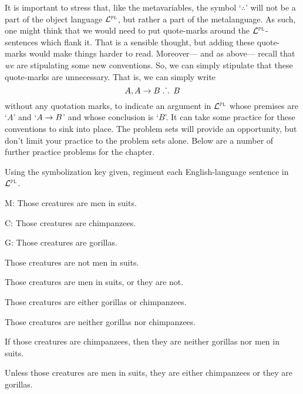 It is important to stress that, like the metavariables, the symbol `$\therefore$' will not be a part of the object language $\mathcal{L}^{\textsc{pl}}$, but rather a part of the metalanguage.
As such, one might think that we would need to put quote-marks around the $\mathcal{L}^{\textsc{pl}}$-sentences which flank it.
That is a sensible thought, but adding these quote-marks would make things harder to read.
Moreover--- and as above--- recall that \emph{we} are stipulating some new conventions.
So, we can simply stipulate that these quote-marks are unnecessary.
That is, we can simply write
$$A, A \rightarrow B \; \ldotp\dot{}\,\ldotp \; B$$
without any quotation marks, to indicate an argument in $\mathcal{L}^{\textsc{pl}}$ whose premises are `$A$' and `$A \rightarrow B$' and whose conclusion is `$B$'.
It can take some practice for these conventions to sink into place.
The problem sets will provide an opportunity, but don't limit your practice to the problem sets alone.
Below are a number of further practice problems for the chapter.









\iffalse

\practiceproblems

\solutions
\problempart Using the symbolization key given, regiment each English-language sentence in $\mathcal{L}^{\textsc{pl}}$.
\label{pr.monkeysuits}
\begin{ekey}
\item[M:] Those creatures are men in suits. 
\item[C:] Those creatures are chimpanzees. 
\item[G:] Those creatures are gorillas.
\end{ekey}
\begin{earg}
\item Those creatures are not men in suits.
\item Those creatures are men in suits, or they are not.
\item Those creatures are either gorillas or chimpanzees.
\item Those creatures are neither gorillas nor chimpanzees.
\item If those creatures are chimpanzees, then they are neither gorillas nor men in suits.
\item Unless those creatures are men in suits, they are either chimpanzees or they are gorillas.
\end{earg}



